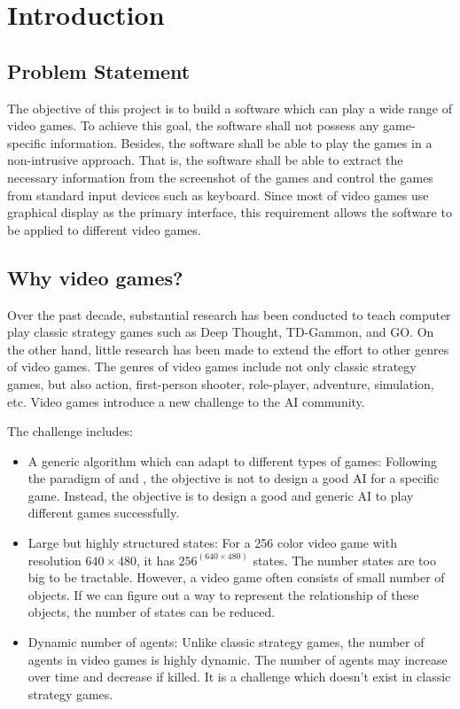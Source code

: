 
\chapter{Introduction}
\label{ch:intro}

\section{Problem Statement}
The objective of this project is to build a software which can play a wide range 
of video games. To achieve this goal, the software shall not possess any game-specific 
information. Besides, the software shall be able to play the games in a non-intrusive approach.
That is, the software shall be able to extract the necessary information 
from the screenshot of the games and control the games from standard input devices such as keyboard.
Since most of video games use graphical display as the primary interface, this requirement allows
the software to be applied to different video games.

\section{Why video games?}
Over the past decade, substantial research has been conducted to teach computer play classic strategy games such
as Deep Thought\cite{DeepBlue}, TD-Gammon\cite{Gammon}, and GO\cite{Go}.
On the other hand, little research has been made\cite{FPS}\cite{Mario} to extend the effort to other genres of video games.
The genres of video games include not only classic strategy games, but also action, first-person shooter, role-player, adventure, simulation, etc.
Video games introduce a new challenge to the AI community.

The challenge includes:
\begin{itemize}{}

\item A generic algorithm which can adapt to different types of games:
Following the paradigm of \cite{GGP} and \cite{Yavar}, the objective is not to design a good AI for
a specific game. Instead, the objective is to design a good and generic AI to play different games successfully.

\item Large but highly structured states:
For a 256 color video game with resolution $640 \times 480$, it has $256^(640 \times 480)$ states.
The number states are too big to be tractable. However, a video game often consists of small number of objects.
If we can figure out a way to represent the relationship of these objects, the number of states
can be reduced.

\item Dynamic number of agents:
Unlike classic strategy games, the number of agents in video games is highly dynamic.
The number of agents may increase over time and decrease if killed.
It is a challenge which doesn't exist in classic strategy games.
\end{itemize}

